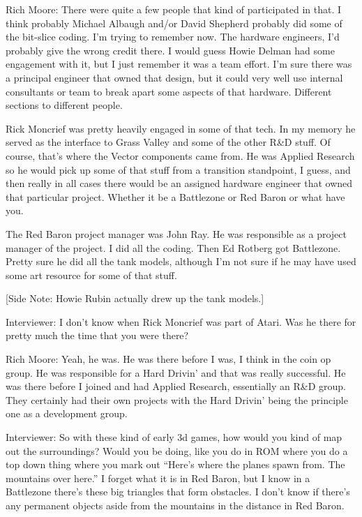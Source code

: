 \textcolor{interviewee}{Rich Moore:} There were quite a few people that kind of participated in that. I think probably Michael Albaugh and/or David Shepherd probably did some of the bit-slice coding. I'm trying to remember now. The hardware engineers, I’d probably give the wrong credit there. I would guess Howie Delman had some engagement with it, but I just remember it was a team effort. I'm sure there was a principal engineer that owned that design, but it could very well use internal consultants or team to break apart some aspects of that hardware. Different sections to different people. 

Rick Moncrief was pretty heavily engaged in some of that tech. In my memory he served as the interface to Grass Valley and some of the other R\&D stuff. Of course, that’s where the Vector components came from. He was Applied Research so he would pick up some of that stuff from a transition standpoint, I guess, and then really in all cases there would be an assigned hardware engineer that owned that particular project. Whether it be a Battlezone or Red Baron or what have you.

The Red Baron project manager was John Ray. He was responsible as a project manager of the project. I did all the coding. Then Ed Rotberg got Battlezone. Pretty sure he did all the tank models, although I'm not sure if he may have used some art resource for some of that stuff.

[Side Note: Howie Rubin actually drew up the tank models.]

\textcolor{interviewer}{Interviewer:} I don’t know when Rick Moncrief was part of Atari. Was he there for pretty much the time that you were there?

\textcolor{interviewee}{Rich Moore:} Yeah, he was. He was there before I was, I think in the coin op group. He was responsible for a Hard Drivin’ and that was really successful. He was there before I joined and had Applied Research, essentially an R\&D group. They certainly had their own projects with the Hard Drivin’ being the principle one as a development group.

\textcolor{interviewer}{Interviewer:} So with these kind of early 3d games, how would you kind of map out the surroundings? Would you be doing, like you do in ROM where you do a top down thing where you mark out “Here's where the planes spawn from. The mountains over here.” I forget what it is in Red Baron, but I know in a Battlezone there's these big triangles that form obstacles. I don't know if there's any permanent objects aside from the mountains in the distance in Red Baron.

